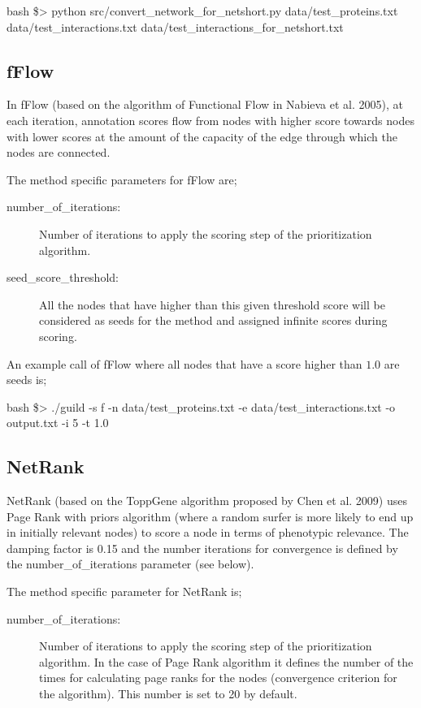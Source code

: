 \documentclass[11pt,twoside]{article}
\newcommand{\printcommand}[1]{\colorbox{code}{\scriptsize{\BUseVerbatim{#1}}}}
\begin{document}
\begin{SaveVerbatim}{bash}
\$> python src/convert_network_for_netshort.py data/test_proteins.txt data/test_interactions.txt 
	data/test_interactions_for_netshort.txt
\end{SaveVerbatim}
\printcommand{bash}


\subsection{fFlow}
In fFlow (based on the algorithm of Functional Flow in Nabieva et al. 2005), 
at each iteration, annotation scores flow from nodes with higher score towards 
nodes with lower scores at the amount of the capacity of the edge through which 
the nodes are connected.

\vspace{5 mm}
The method specific parameters for fFlow are;
\begin{description}
    \item[number\_of\_iterations:] Number of iterations to apply the scoring 
	step of the prioritization algorithm. 
    \item[seed\_score\_threshold:] All the nodes that have higher than this 
	given threshold score will be considered as seeds for the method and 
	assigned infinite scores during scoring.
\end{description}


An example call of fFlow where all nodes that have a score higher than $1.0$ are seeds is;

\begin{SaveVerbatim}{bash}
\$> ./guild -s f -n data/test_proteins.txt -e data/test_interactions.txt -o output.txt -i 5 -t 1.0
\end{SaveVerbatim}
\printcommand{bash}

\subsection{NetRank}
NetRank (based on the ToppGene algorithm proposed by Chen et al. 2009) uses 
Page Rank with priors algorithm (where a random surfer is more likely to end 
up in initially relevant nodes) to score a node in terms of phenotypic 
relevance. The damping factor is 0.15 and the number iterations for convergence 
is defined by the number\_of\_iterations parameter (see below).

\vspace{5 mm}
The method specific parameter for NetRank is;
\begin{description}
    \item[number\_of\_iterations:] Number of iterations to apply the scoring step of the prioritization algorithm. In the case of Page Rank algorithm it defines the number of the times for calculating page ranks for the nodes (convergence criterion for the algorithm). This number is set to 20 by default.
\end{description}
\end{document}

